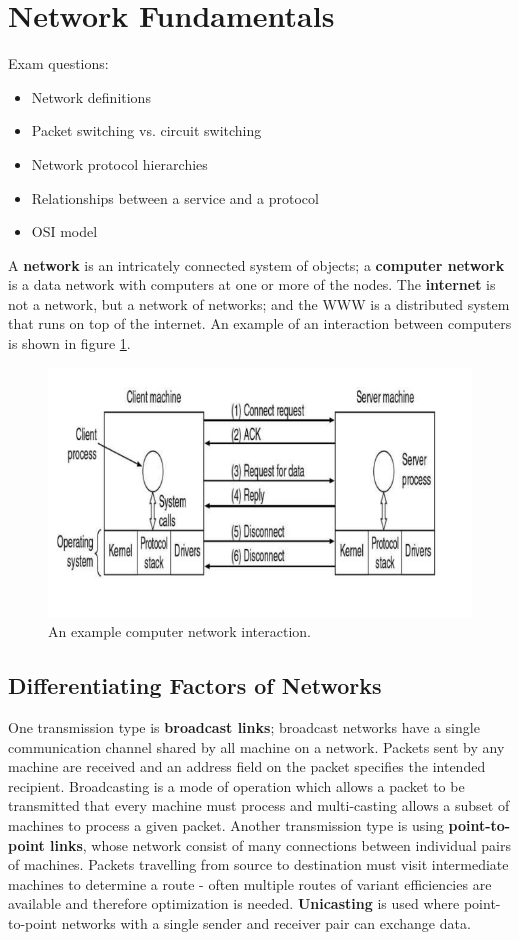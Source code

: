 \documentclass[twoside]{article}
\begin{document}
\section{Network Fundamentals}
Exam questions:
\begin{itemize}
    \item Network definitions
    \item Packet switching vs. circuit switching
    \item Network protocol hierarchies 
    \item Relationships between a service and a protocol
    \item OSI model
\end{itemize}
A \textbf{network} is an intricately connected system of objects; a \textbf{computer
network} is a data network with computers at one or more of the nodes. The
\textbf{internet} is not a network, but a network of networks; and the WWW is
a distributed system that runs on top of the internet. An example of an 
interaction between computers is shown in figure \ref{fig:network-example}.
\begin{figure}
  \includegraphics[width=\linewidth]{network-example.png}
  \caption{An example computer network interaction.}
  \label{fig:network-example}
\end{figure}
\subsection{Differentiating Factors of Networks}
One transmission type is \textbf{broadcast links}; broadcast networks have 
a single communication channel shared by all machine on a network. Packets
sent by any machine are received and an address field on the packet specifies
the intended recipient. Broadcasting is a mode of operation which allows a 
packet to be transmitted that every machine must process and multi-casting allows
a subset of machines to process a given packet. Another transmission type is
using \textbf{point-to-point links}, whose network consist of many connections
between individual pairs of machines. Packets travelling from source to 
destination must visit intermediate machines to determine a route - often
multiple routes of variant efficiencies are available and therefore optimization
is needed. \textbf{Unicasting} is used where point-to-point networks with a 
single sender and receiver pair can exchange data.
\end{document}
